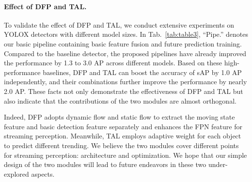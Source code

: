 \documentclass[10pt,twocolumn,letterpaper]{article}
\begin{document}
\paragraph{Effect of DFP and TAL.} To validate the effect of DFP and TAL, we conduct extensive experiments on YOLOX detectors with different model sizes. In Tab.~\ref{tab:table3}, ``Pipe.'' denotes our basic pipeline containing basic feature fusion and future prediction training. Compared to the baseline detector, the proposed pipelines have already improved the performance by 1.3 to 3.0 AP across different models. Based on these high-performance baselines, DFP and TAL can boost the accuracy of sAP by 1.0 AP independently, and their combinations further improve the performance by nearly 2.0 AP. These facts not only demonstrate the effectiveness of DFP and TAL but also indicate that the contributions of the two modules are almost orthogonal. 

Indeed, DFP adopts dynamic flow and static flow to extract the moving state feature and basic detection feature separately and enhances the FPN feature for streaming perception. Meanwhile, TAL employs adaptive weight for each object to predict different trending. We believe the two modules cover different points for streaming perception: architecture and optimization. We hope that our simple design of the two modules will lead to future endeavors in these two under-explored aspects.
\end{document}
